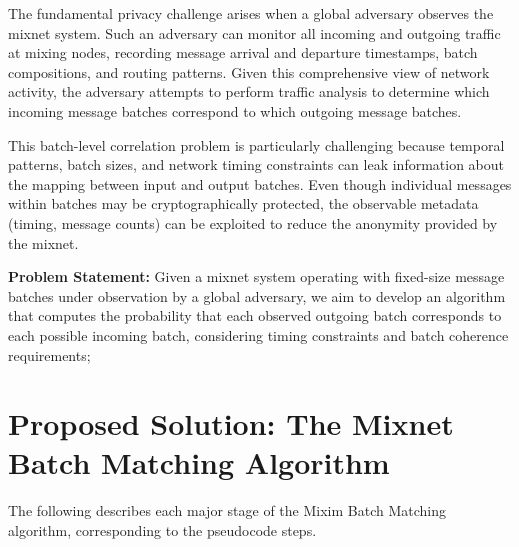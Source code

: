 \documentclass{article}
\begin{document}
The fundamental privacy challenge arises when a global adversary observes 
the mixnet system. Such an adversary can monitor all incoming and outgoing 
traffic at mixing nodes, recording message arrival and departure timestamps, 
batch compositions, and routing patterns. Given this comprehensive view of 
network activity, the adversary attempts to perform traffic analysis to 
determine which incoming message batches correspond to which outgoing 
message batches.

This batch-level correlation problem is particularly challenging because 
temporal patterns, batch sizes, and network timing constraints can leak 
information about the mapping between input and output batches. Even 
though individual messages within batches may be cryptographically 
protected, the observable metadata (timing, message counts) 
can be exploited to reduce the anonymity provided by the mixnet.

\textbf{Problem Statement:} Given a mixnet system operating with fixed-size 
message batches under observation by a global adversary, we aim to develop 
an algorithm that computes the probability 
that each observed outgoing batch corresponds to each possible incoming 
batch, considering timing constraints and batch coherence requirements;

\section{Proposed Solution: The Mixnet Batch Matching Algorithm}
\label{sec:solution}

The following describes each major stage of the Mixim Batch 
Matching algorithm, corresponding to the pseudocode steps.

\end{document}
